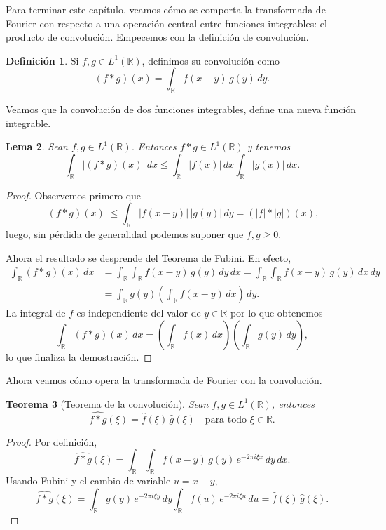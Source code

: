 \documentclass[12pt, a4paper]{amsbook}
\newcommand{\R}{{\mathbb R}}
\newtheorem{teo}{Teorema}[section]
\newtheorem{lema}[teo]{Lema}
\theoremstyle{remark}
\theoremstyle{definition}
\newtheorem{defi}[teo]{Definición}
\numberwithin{section}{chapter}
\numberwithin{subsection}{section}
\numberwithin{equation}{section}
\numberwithin{figure}{chapter}
\begin{document}
Para terminar este capítulo, veamos cómo se comporta la transformada de Fourier con respecto a una operación central entre funciones integrables: el producto de convolución. Empecemos con la definición de convolución.
\begin{defi}
Si $f,g\in L^1(\R)$, definimos su convolución como
$$
(f*g)(x)=\int_{\R} f(x-y)\,g(y)\,dy.
$$
\end{defi}

Veamos que la convolución de dos funciones integrables, define una nueva función integrable.
\begin{lema}
Sean $f, g\in L^1(\R)$. Entonces $f*g\in L^1(\R)$ y tenemos
$$
\int_\R |(f*g)(x)|\, dx \le \int_\R |f(x)|\, dx \int_\R |g(x)|\, dx.
$$
\end{lema}

\begin{proof}
Observemos primero que
$$
|(f*g)(x)|\le \int_\R |f(x-y)|\, |g(y)|\, dy = (|f|*|g|)(x),
$$
luego, sin pérdida de generalidad podemos suponer que $f, g\ge 0$.

Ahora el resultado se desprende del Teorema de Fubini. En efecto,
\begin{align*}
\int_\R (f*g)(x)\, dx &= \int_\R \int_\R f(x-y)\, g(y)\, dy\, dx = \int_\R \int_\R f(x-y)\, g(y)\, dx\, dy\\
&= \int_\R g(y) \left(\int_\R f(x-y)\, dx\right)\, dy.
\end{align*}
La integral de $f$ es independiente del valor de $y\in\R$ por lo que obtenemos
$$
\int_\R (f*g)(x)\, dx = \left(\int_\R f(x)\, dx\right)\left(\int_\R g(y)\, dy\right),
$$
lo que finaliza la demostración.
\end{proof}

Ahora veamos cómo opera la transformada de Fourier con la convolución.

\begin{teo}[Teorema de la convolución]\label{trans.conv}
Sean $f,g\in L^1(\R)$, entonces
$$
\widehat{f*g}(\xi)=\hat f(\xi)\,\hat g(\xi) \quad\text{para todo }\xi\in\R.
$$
\end{teo}

\begin{proof}
Por definición,
$$
\widehat{f*g}(\xi) = \int_{\R}\int_{\R} f(x-y)\,g(y)\,e^{-2\pi i \xi x}\,dy\,dx.
$$
Usando Fubini y el cambio de variable $u=x-y$,
$$
\widehat{f*g}(\xi) = \int_{\R} g(y)\,e^{-2\pi i \xi y}\,dy \int_{\R} f(u)\,e^{-2\pi i \xi u}\,du = \hat f(\xi)\,\hat g(\xi).
$$
\end{proof}
\end{document}
